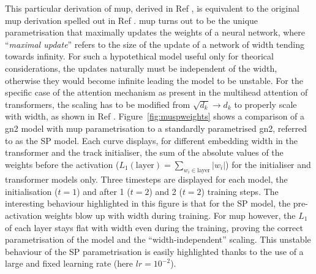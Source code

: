 This particular derivation of \gls{mup}, derived in Ref \cite{yang2021tuning}, is equivalent to the original \gls{mup} derivation spelled out in Ref \cite{pmlr-v139-yang21c}. \gls{mup} turns out to be the unique parametrisation that maximally updates the weights of a neural network, where ``\textit{maximal update}'' refers to the size of the update of a network of width tending towards infinity. For such a hypotethical model useful only for theorical considerations, the updates naturally must be independent of the width, otherwise they would become infinite leading the model to be unstable. For the specific case of the attention mechanism as present in the multihead attention of transformers, the scaling has to be modified from $\sqrt{d_k} \rightarrow d_k$ to properly scale with width, as shown in Ref \cite{yang2021tuning}. Figure~\ref{fig:muspweights} shows a comparison of a \gls{gn2} model with \gls{mup} parametrisation to a standardly parametrised \gls{gn2}, referred to as the SP model. Each curve displays, for different embedding width in the transformer and the track initialiser, the sum of the absolute values of the weights before the activation ($L_1(\textrm{layer}) = \sum_{w_i \in \textrm{layer}} |w_i|$) for the initialiser and transformer models only. Three timesteps are displayed for each model, the initialisation ($t=1$) and after 1 ($t=2$) and 2 ($t=2$) training steps. The interesting behaviour highlighted in this figure is that for the SP model, the pre-activation weights blow up with width during training. For \gls{mup} however, the $L_1$ of each layer stays flat with width even during the training, proving the correct parametrisation of the model and the ``width-independent'' scaling. This unstable behaviour of the SP parametrisation is easily highlighted thanks to the use of a large and fixed learning rate (here $lr = 10^{-2}$). 

